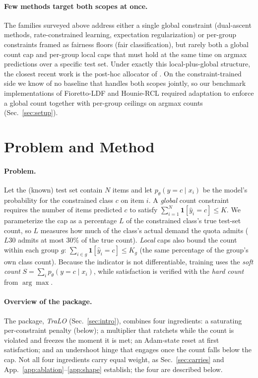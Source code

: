 \documentclass[10pt]{article}
\begin{document}
\paragraph{Few methods target both scopes at once.}
The families surveyed above address either a single global constraint
(dual-ascent methods, rate-constrained learning, expectation
regularization) or per-group constraints framed as fairness floors (fair
classification), but rarely both a global count cap and per-group local
caps that must hold at the same time on argmax predictions over a
specific test set. Under exactly this local-plus-global structure, the
closest recent work is the post-hoc allocator of
\citet{shifman2025classification}. On the constraint-trained side we
know of no baseline that handles both scopes jointly, so our benchmark
implementations of Fioretto-LDF and Hounie-RCL required adaptation to
enforce a global count together with per-group ceilings on argmax
counts (Sec.~\ref{sec:setup}).

\section{Problem and Method}
\label{sec:method}

\paragraph{Problem.}
Let the (known) test set contain $N$ items and let $p_\theta(y=c\mid x_i)$ be
the model's probability for the constrained class $c$ on item $i$. A
\emph{global} count constraint requires the number of items predicted $c$ to
satisfy $\sum_{i=1}^{N}\mathbf{1}[\hat y_i = c] \le K$. We parameterize the
cap as a percentage $L$ of the constrained class's true test-set count, so
$L$ measures how much of the class's actual demand the quota admits ($L30$
admits at most $30\%$ of the true count). \emph{Local} caps also bound the
count within each group $g$: $\sum_{i\in g}\mathbf{1}[\hat y_i=c]\le K_g$
(the same percentage of the group's own class count). Because the indicator
is not differentiable, training uses the \emph{soft count}
$S=\sum_i p_\theta(y=c\mid x_i)$, while satisfaction is verified with the
\emph{hard count} from $\arg\max$.

\paragraph{Overview of the package.}
{The package, \emph{TraLO}
(Sec.~\ref{sec:intro}), combines} four ingredients: a saturating
per-constraint penalty (below); a multiplier that ratchets while the count is
violated and freezes the moment it is met; an Adam-state reset at first
satisfaction; and an undershoot hinge that engages once the count falls below
the cap. Not all four ingredients carry equal weight{, as Sec.~\ref{sec:carries}
and App.~\ref{app:ablation}--\ref{app:shape} establish; the four are described
below.}
\end{document}
